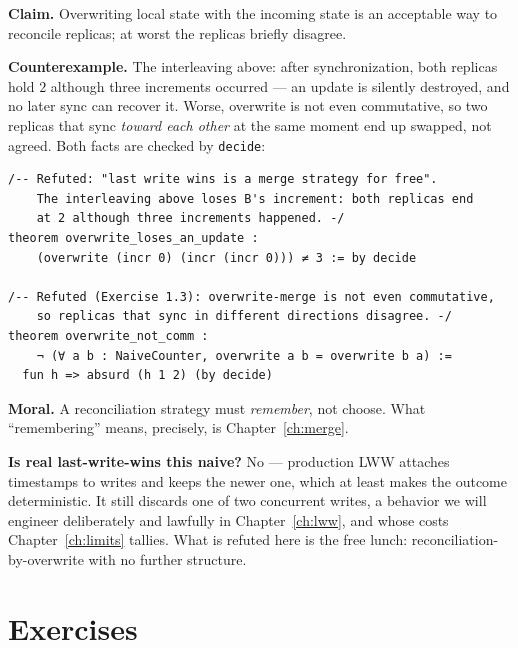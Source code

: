 \documentclass[12pt, a4paper, openright]{book}
\theoremstyle{thmstyle}
\theoremstyle{defstyle}
\newcommand{\lc}[1]{\texttt{#1}}
\newenvironment{notebox}{%
  \begin{tcolorbox}[notebox]%
}{\end{tcolorbox}}
\newcounter{refutation}[chapter]
\renewcommand{\therefutation}{\thechapter.\arabic{refutation}}
\newenvironment{refutedbox}[1]{%
  \refstepcounter{refutation}%
  \begin{tcolorbox}[refutedbox,
    title={Refuted \therefutation\ --- #1}]%
}{\end{tcolorbox}}
\begin{document}
\begin{refutedbox}{Last write wins is a merge strategy for free}
\label{ref:overwrite}
  \textbf{Claim.} Overwriting local state with the incoming state is an
  acceptable way to reconcile replicas; at worst the replicas briefly
  disagree.

  \textbf{Counterexample.} The interleaving above: after
  synchronization, both replicas hold $2$ although three increments
  occurred --- an update is silently destroyed, and no later sync can
  recover it. Worse, overwrite is not even commutative, so two replicas
  that sync \emph{toward each other} at the same moment end up swapped,
  not agreed. Both facts are checked by \lc{decide}:

\begin{verbatim}
/-- Refuted: "last write wins is a merge strategy for free".
    The interleaving above loses B's increment: both replicas end
    at 2 although three increments happened. -/
theorem overwrite_loses_an_update :
    (overwrite (incr 0) (incr (incr 0))) ≠ 3 := by decide

/-- Refuted (Exercise 1.3): overwrite-merge is not even commutative,
    so replicas that sync in different directions disagree. -/
theorem overwrite_not_comm :
    ¬ (∀ a b : NaiveCounter, overwrite a b = overwrite b a) :=
  fun h => absurd (h 1 2) (by decide)
\end{verbatim}

  \textbf{Moral.} A reconciliation strategy must \emph{remember}, not
  choose. What ``remembering'' means, precisely, is
  Chapter~\ref{ch:merge}.
\end{refutedbox}

\begin{notebox}
  \textbf{Is real last-write-wins this naive?} No --- production LWW
  attaches timestamps to writes and keeps the newer one, which at least
  makes the outcome deterministic. It still discards one of two
  concurrent writes, a behavior we will engineer deliberately and
  lawfully in Chapter~\ref{ch:lww}, and whose costs
  Chapter~\ref{ch:limits} tallies. What is refuted here is the free
  lunch: reconciliation-by-overwrite with no further structure.
\end{notebox}

\section{Exercises}
\end{document}
